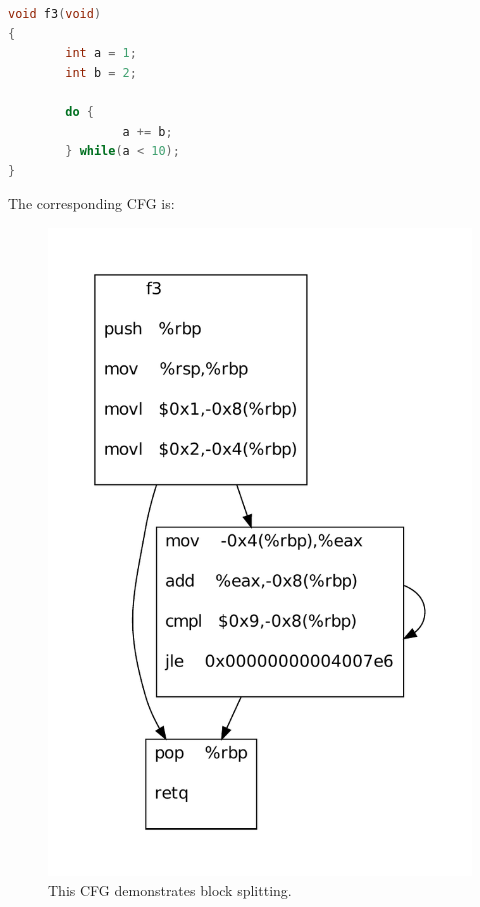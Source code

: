 \noindent\begin{minipage}{\textwidth}
\begin{lstlisting}[language=C,caption={This function results in a critical edge during CFG generation.},label={lst:Critical_Edge}]
void f3(void)
{
        int a = 1;
        int b = 2;

        do {
                a += b;
        } while(a < 10);
}
\end{lstlisting}
\end{minipage}

\noindent\begin{minipage}{\textwidth}
The corresponding CFG is:

\begin{figure}[H]
 \centering
 \includegraphics[scale=0.55]{Critical_Edge.pdf}
 \caption{This CFG demonstrates block splitting.}
 \label{fig:Critical_Edge}
\end{figure}
\end{minipage}


